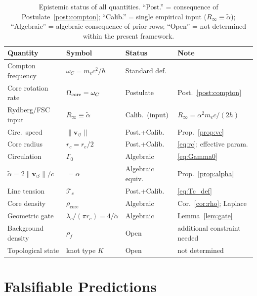 \documentclass[aps,pra,preprint,longbibliography,nofootinbib]{revtex4-2}
\newcommand{\vnorm}{\lVert\mathbf{v}_{\!\boldsymbol{\circlearrowleft}}\rVert} %
\newcommand{\rhof}{\rho_{\!f}}                   %
\newcommand{\rhocore}{\rho_{\mathrm{core}}}      %
\newcommand{\rc}{r_c}                            %
\newcommand{\omC}{\omega_C}                      %
\newcommand{\lc}{\lambda_c}                      %
\newcommand{\Rinf}{R_\infty}                     %
\newcommand{\Tc}{\mathcal{T}_c}                  %
\newcommand{\Gz}{\Gamma_0}                       %
\begin{document}
\begin{table}[h]
\centering
\caption{Epistemic status of all quantities.
``Post.'' = consequence of Postulate~\ref{post:compton};
``Calib.'' = single empirical input ($\Rinf\equiv\tilde\alpha$);
``Algebraic'' = algebraic consequence of prior rows;
``Open'' = not determined within the present framework.}
\label{tab:status}
\begin{tabular}{lllp{4cm}}
\toprule
Quantity & Symbol & Status & Note \\
\midrule
Compton frequency  & $\omC = m_e c^2/\hbar$     & Standard def.  & \cite{MohrTaylor2018} \\
Core rotation rate & $\Omega_{\rm core}=\omC$   & Postulate       & Post.~\ref{post:compton} \\
Rydberg/FSC input  & $\Rinf\equiv\tilde\alpha$  & Calib.\ (input) & $\Rinf=\alpha^2 m_e c/(2h)$ \\
Circ.\ speed       & $\vnorm$                   & Post.+Calib.    & Prop.~\ref{prop:vc} \\
Core radius        & $\rc = r_e/2$              & Post.+Calib.    & \eqref{eq:rc}; effective param. \\
Circulation        & $\Gz$                      & Algebraic       & \eqref{eq:Gamma0} \\
$\tilde\alpha=2\vnorm/c$ & $=\alpha$          & Algebraic equiv.& Prop.~\ref{prop:alpha} \\
Line tension       & $\Tc$                      & Post.+Calib.    & \eqref{eq:Tc_def} \\
Core density       & $\rhocore$                 & Algebraic       & Cor.~\ref{cor:rho}; Laplace \\
Geometric gate     & $\lc/(\pi\rc)=4/\tilde\alpha$ & Algebraic  & Lemma~\ref{lem:gate} \\
Background density & $\rhof$                    & Open            & additional constraint needed \\
Topological state  & knot type $K$              & Open            & not determined \\
\bottomrule
\end{tabular}
\end{table}

\section{Falsifiable Predictions}
\label{sec:falsifiers}
\end{document}
